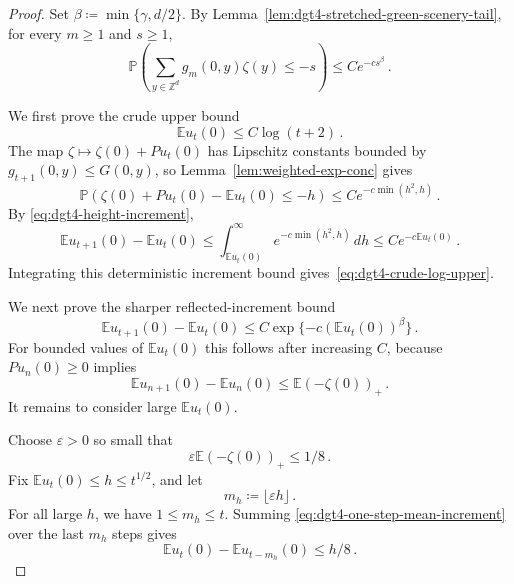 \documentclass[11pt]{amsart}
\theoremstyle{plain}
\theoremstyle{definition}
\newcommand{\Z}{\mathbb{Z}}
\newcommand{\E}{\mathbb{E}}
\renewcommand{\P}{\mathbb{P}}
\begin{document}
		\begin{proof}
			Set $\beta\coloneqq\min\{\gamma,d/2\}$.
			By Lemma~\ref{lem:dgt4-stretched-green-scenery-tail}, for every $m\geq1$ and $s\geq1$,
			\begin{equation}\label{eq:dgt4-refined-green-tail}
				\P\left(\sum_{y\in\Z^d}g_m(0,y)\zeta(y)\leq -s\right)
				\leq
			    Ce^{-cs^\beta}\, .
			\end{equation}

			We first prove the crude upper bound
			\begin{equation}\label{eq:dgt4-crude-log-upper}
				\E u_t(0)\leq C\log(t+2)\, .
			\end{equation} 
			The map
			$\zeta\mapsto \zeta(0)+Pu_t(0)$ has Lipschitz constants bounded by
			$g_{t+1}(0,y)\leq G(0,y)$, so Lemma~\ref{lem:weighted-exp-conc} gives
			\begin{equation}\label{eq:dgt4-crude-tail}
				\P\left(\zeta(0)+Pu_t(0)-\E u_t(0)\leq-h\right)
				\leq
				Ce^{-c\min(h^2,h)}\, .
			\end{equation}
			By \eqref{eq:dgt4-height-increment},
			\[
			\E u_{t+1}(0)-\E u_t(0)
				\leq
				\int_{\E u_t(0)}^\infty e^{-c\min(h^2,h)}\,dh
				\leq
				Ce^{-c\E u_t(0)}\, .
			\]
			Integrating this deterministic increment bound gives~\eqref{eq:dgt4-crude-log-upper}.


			We next prove the sharper reflected-increment bound
			\begin{equation}\label{eq:dgt4-reduction-increment}
				\E u_{t+1}(0)-\E u_t(0)
				\leq
				C\exp\{-c(\E u_t(0))^\beta\}\, .
			\end{equation}
			For bounded values of $\E u_t(0)$ this follows after increasing $C$,
			because $Pu_n(0)\geq0$ implies
			\begin{equation}\label{eq:dgt4-one-step-mean-increment}
				\E u_{n+1}(0)-\E u_n(0)\leq \E(-\zeta(0))_+\, .
			\end{equation}
			It remains to consider large $\E u_t(0)$.

			Choose $\varepsilon>0$ so small that
			\[
				\varepsilon\E(-\zeta(0))_+\leq1/8\, .
			\]
			Fix $\E u_t(0)\leq h\leq t^{1/2}$, and let
			\[
				m_h\coloneqq\lfloor\varepsilon h\rfloor\, .
			\]
			For all large $h$, we have $1\leq m_h\leq t$. Summing
			\eqref{eq:dgt4-one-step-mean-increment} over the last $m_h$ steps gives
			\begin{equation}\label{eq:dgt4-short-backward-mean-change}
				\E u_t(0)-\E u_{t-m_h}(0)\leq h/8\, .
			\end{equation}


\end{proof}
\end{document}
